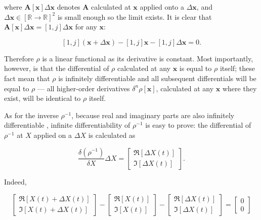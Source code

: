 	\noindent where $\mathbf{A}\left[\mathbf{x}\right]\Delta\mathbf{x}$ denotes $\mathbf{A}$ calculated at $\mathbf{x}$ applied onto a $\Delta\mathbf{x}$, and $\Delta\mathbf{x}\in\left[\mathbb{R}\to\mathbb{R}\right]^2$ is small enough so the limit exists.  It is clear that $\mathbf{A}\left[\mathbf{x}\right]\Delta\mathbf{x} = \left[1,j\right]\Delta\mathbf{x}$ for any $\mathbf{x}$:

\begin{equation} \left[1,j\right]\left(\mathbf{x} + \Delta\mathbf{x}\right) - \left[1,j\right]\mathbf{x} - \left[1,j\right]\Delta\mathbf{x} = 0 . \end{equation}

	Therefore $\rho$ is a linear functional as its derivative is constant. Most importantly, however, is that the differential of $\rho$ calculated at any $\mathbf{x}$ is equal to $\rho$ itself; these fact mean that $\rho$ is infinitely differentiable and all subsequent differentials will be equal to $\rho$ — all higher-order derivatives $\delta^n \rho\left[\mathbf{x}\right]$, calculated at any $\mathbf{x}$ where they exist, will be identical to $\rho$ itself.

	As for the inverse $\rho^{-1}$, because real and imaginary parts are also infinitely differentiable , infinite differentiability of $\rho^{-1}$ is easy to prove: the differential of $\rho^{-1}$ at $X$ applied on a $\Delta X$ is calculated as

\begin{equation} \dfrac{\delta\left(\rho^{-1}\right)}{\delta X} \Delta X = \left[\begin{array}{c} \Re\left[\Delta X(t)\right] \\[5mm] \Im\left[\Delta X(t)\right] \end{array}\right] .\end{equation}

	Indeed,

\begin{equation} \left[\begin{array}{c} \Re\left[X(t) + \Delta X(t)\right] \\[5mm] \Im\left[X(t) + \Delta X(t)\right] \end{array}\right] - \left[\begin{array}{c} \Re\left[X(t)\right] \\[5mm] \Im\left[X(t)\right] \end{array}\right] - \left[\begin{array}{c} \Re\left[\Delta X(t)\right] \\[5mm] \Im\left[\Delta X(t)\right] \end{array}\right] = \left[\begin{array}{c} 0 \\[5mm] 0 \end{array}\right]  \end{equation}

